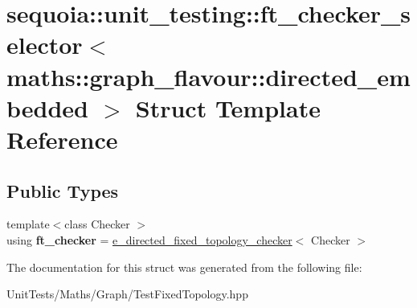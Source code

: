 \hypertarget{structsequoia_1_1unit__testing_1_1ft__checker__selector_3_01maths_1_1graph__flavour_1_1directed__embedded_01_4}{}\section{sequoia\+::unit\+\_\+testing\+::ft\+\_\+checker\+\_\+selector$<$ maths\+::graph\+\_\+flavour\+::directed\+\_\+embedded $>$ Struct Template Reference}
\label{structsequoia_1_1unit__testing_1_1ft__checker__selector_3_01maths_1_1graph__flavour_1_1directed__embedded_01_4}
\subsection*{Public Types}
\begin{DoxyCompactItemize}
\item 
\mbox{\label{structsequoia_1_1unit__testing_1_1ft__checker__selector_3_01maths_1_1graph__flavour_1_1directed__embedded_01_4_aae20aabb56cbd5ca49afec01a3674e82}} 
{\footnotesize template$<$class Checker $>$ }\\using {\bfseries ft\+\_\+checker} = \mbox{\hyperlink{classsequoia_1_1unit__testing_1_1e__directed__fixed__topology__checker}{e\+\_\+directed\+\_\+fixed\+\_\+topology\+\_\+checker}}$<$ Checker $>$
\end{DoxyCompactItemize}


The documentation for this struct was generated from the following file\+:\begin{DoxyCompactItemize}
\item 
Unit\+Tests/\+Maths/\+Graph/Test\+Fixed\+Topology.\+hpp\end{DoxyCompactItemize}
